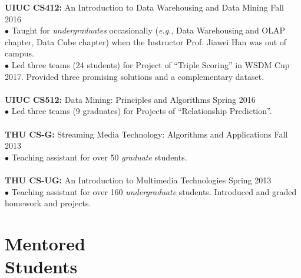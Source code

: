 \documentclass[margin, 10pt]{res}
\begin{document}
\begin{resume}
{\textbf{UIUC CS412:} An Introduction to Data Warehousing and Data Mining} \hfill{Fall 2016} \\
$\bullet$ Taught for \textit{undergraduates} occasionally (\textit{e.g.}, Data Warehousing and OLAP chapter, Data Cube chapter) when the Instructor Prof. Jiawei Han was out of campus. \\
$\bullet$ Led three teams (24 students) for Project of ``Triple Scoring'' in WSDM Cup 2017. Provided three promising solutions and a complementary dataset. \\ \\
{\textbf{UIUC CS512:} Data Mining: Principles and Algorithms} \hfill{Spring 2016} \\
$\bullet$ Led three teams (9 graduates) for Projects of ``Relationship Prediction''. \\ \\
{\textbf{THU CS-G:} Streaming Media Technology: Algorithms and Applications} \hfill{Fall 2013} \\
$\bullet$ Teaching assistant for over 50 \textit{graduate} students. \\ \\
{\textbf{THU CS-UG:} An Introduction to Multimedia Technologies} \hfill{Spring 2013} \\
$\bullet$ Teaching assistant for over 160 \textit{undergraduate} students. Introduced and graded homework and projects.


\section{Mentored \\ Students}


\end{resume}
\end{document}
